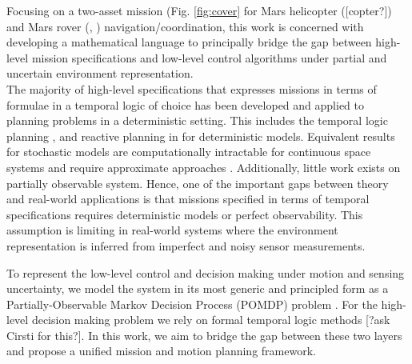 \documentclass[conference]{IEEEtran}
\begin{document}
    Focusing on a two-asset mission (Fig. \ref{fig:cover} for Mars helicopter ([copter?]) and Mars rover (\cite{traverse2020}, \cite{mars2012}) navigation/coordination, this work is concerned with developing a mathematical language to principally bridge the gap between high-level mission specifications and low-level control algorithms under partial and uncertain environment representation. \\
    The majority of high-level specifications that expresses missions in terms of formulae in a temporal logic of choice has been developed and applied to planning problems in a deterministic setting. This includes the temporal logic planning \cite{KB-TAC08-LTLCon}, and
    reactive planning in  \cite{kress-gazit:whereswaldo?,Murray2009} for deterministic models. Equivalent results for stochastic models are computationally intractable for continuous space systems and require approximate approaches \cite{soudjani2015faust,haesaert2017verification}. Additionally, little work exists on partially observable system.
    Hence, one of the important gaps between theory and real-world applications is that %
    missions specified in terms of temporal specifications requires deterministic models or perfect observability. %
    This assumption is limiting in real-world systems where the environment representation %
    is inferred from imperfect and noisy sensor measurements.
    
    To represent the low-level control and decision making under motion and sensing uncertainty, we model the system %
    in its most generic and principled form as a Partially-Observable Markov Decision Process (POMDP) problem \cite{Leslie98} \cite{Smallwood73} \cite{Bertsekas2012}. For the high-level decision making problem we rely on formal temporal logic methods [?ask Cirsti for this?]. In this work, we aim to bridge the gap between these two layers and propose a unified mission and motion planning framework.
	
\end{document}
